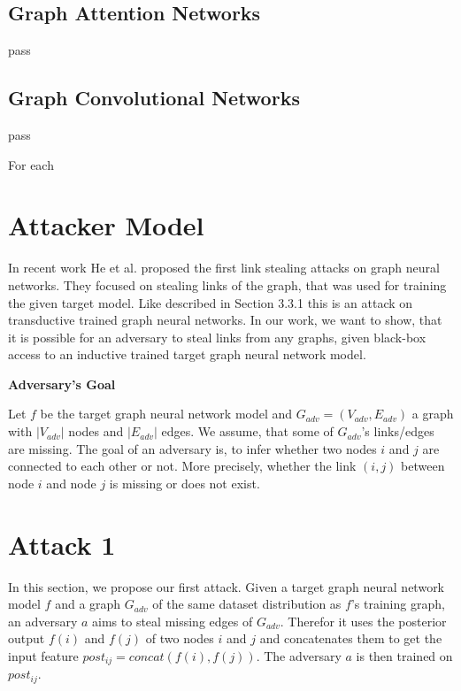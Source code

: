     \subsection{Graph Attention Networks}
      pass

    \subsection{Graph Convolutional Networks}
      pass

    For each   


  \section{Attacker Model}


  \newpage

  In recent work He et al. \cite{DBLP:journals/corr/abs-2005-02131} proposed the first link stealing attacks on graph neural networks.
  They focused on stealing links of the graph, that was used for training the given target model.
  Like described in Section 3.3.1 this is an attack on transductive trained graph neural networks.
  In our work, we want to show, that it is possible for an adversary to steal links from any graphs, given black-box access to an inductive trained target graph neural network model.

  \textbf{Adversary's Goal}

  Let $f$ be the target graph neural network model and $G_{adv} = (V_{adv}, E_{adv})$ a graph with $|V_{adv}|$ nodes and $|E_{adv}|$ edges. 
  We assume, that some of $G_{adv}$'s links/edges are missing.
  The goal of an adversary is, to infer whether two nodes $i$ and $j$ are connected to each other or not.
  More precisely, whether the link $(i,j)$ between node $i$ and node $j$ is missing or does not exist.
  

  \section{Attack 1}

    In this section, we propose our first attack. 
    Given a target graph neural network model $f$ and a graph $G_{adv}$ of the same dataset distribution as $f$'s training graph, an adversary $a$ aims to steal missing edges of $G_{adv}$.
    Therefor it uses the posterior output $f(i)$ and $f(j)$ of two nodes $i$ and $j$ and concatenates them to get the input feature $post_{ij} = concat(f(i),f(j))$. The adversary $a$ is then trained on $post_{ij}$.

